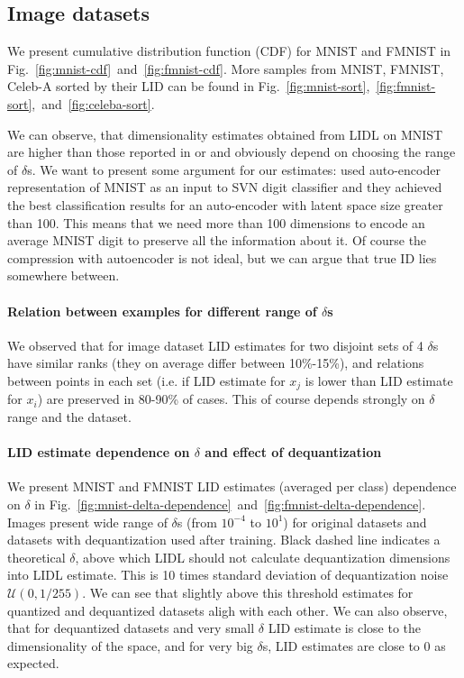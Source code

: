 \subsection{Image datasets}
\label{sec:details-image}
We present cumulative distribution function (CDF) for MNIST and FMNIST in Fig.~\ref{fig:mnist-cdf}~and~\ref{fig:fmnist-cdf}.  More samples from MNIST, FMNIST, Celeb-A sorted by their LID can be found in Fig.~\ref{fig:mnist-sort},~\ref{fig:fmnist-sort},~and~\ref{fig:celeba-sort}.


We can observe, that dimensionality estimates obtained from LIDL on MNIST are higher than those reported in \cite{pope2020intrinsic} or \cite{kleindessner2015dimensionality} and obviously depend on choosing the range of $\delta$s. We want to present some argument for our estimates:
\cite{cavallari2018unsupervised} used auto-encoder representation of MNIST as an input to SVN digit classifier and they achieved the best classification results for an auto-encoder with latent space size greater than 100. This means that we need more than 100 dimensions to encode an average MNIST digit to preserve all the information about it. Of course the compression with autoencoder is not ideal, but we can argue that true ID lies somewhere between.

\paragraph{Relation between examples for different range of $\delta$s}
We observed that for image dataset LID estimates for two disjoint sets of 4 $\delta$s have similar ranks (they on average differ between 10\%-15\%), and relations between points in each set (i.e. if LID estimate for $x_j$ is lower than LID estimate for $x_i$) are preserved in 80-90\% of cases. This of course depends strongly on $\delta$ range and the dataset.

\paragraph{LID estimate dependence on $\delta$ and effect of dequantization}


We present MNIST and FMNIST LID estimates (averaged per class) dependence on $\delta$ in Fig.~\ref{fig:mnist-delta-dependence}~and~\ref{fig:fmnist-delta-dependence}. Images present wide range of $\delta$s (from $10^{-4}$ to $10^{1}$) for original datasets and datasets with dequantization used after training. Black dashed line indicates a theoretical $\delta$, above which LIDL should not calculate dequantization dimensions into LIDL estimate. This is 10 times standard deviation of dequantization noise $\mathcal{U}(0,1/255)$. We can see that slightly above this threshold estimates for quantized and dequantized datasets aligh with each other. We can also observe, that for dequantized datasets and very small $\delta$ LID estimate is close to the dimensionality of the space, and for very big $\delta$s, LID estimates are close to 0 as expected.

